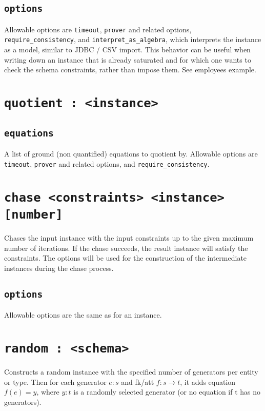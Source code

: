 \documentclass[10pt]{book}
\begin{document}
\subsection{{\tt options}}
Allowable options are {\tt timeout}, {\tt prover} and related options, {\tt require\_consistency}, and {\tt interpret\_as\_algebra}, which interprets the instance as a model, similar to JDBC / CSV import.  This behavior can be useful when writing down an instance that is already saturated and for which one wants to check the schema constraints, rather than impose them. See employees example.

\section{{\tt quotient : <instance>}}

\subsection{{\tt equations}}
A list of ground (non quantified) equations to quotient by.  Allowable options are {\tt timeout}, {\tt prover} and related options, and {\tt require\_consistency}.

\section{{\tt chase <constraints> <instance> [number]}}

Chases the input instance with the input constraints up to the given maximum number of iterations.  If the chase succeeds, the result instance will satisfy the constraints.  The options will be used for the construction of the intermediate instances during the chase process.

\subsection{{\tt options}}
Allowable options are the same as for an instance.


\section{{\tt random : <schema>}}

Constructs a random instance with the specified number of generators per entity or type. Then for each generator $e:s$ and fk/att $f : s \to t$, it adds equation $f(e) = y$, where $y:t$ is a randomly selected generator (or no equation if t has no generators).
\end{document}
